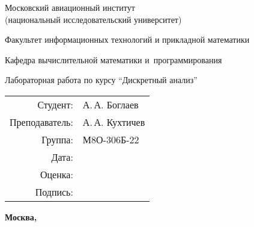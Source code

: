 \begin{titlepage}
    \begin{center}
    \bfseries
    
    {\Large Московский авиационный институт\\ (национальный исследовательский университет)
    
    }
    
    \vspace{48pt}
    
    {\large Факультет информационных технологий и прикладной математики
    }
    
    \vspace{36pt}
    
    {\large Кафедра вычислительной математики и~программирования
    
    }
    
    
    \vspace{48pt}
    
    Лабораторная работа  по курсу \enquote{Дискретный анализ}
    
    \end{center}
    
    \vspace{72pt}
    
    \begin{flushright}
    \begin{tabular}{rl}
    Студент: & А.\,А. Боглаев \\
    Преподаватель: & А.\,А. Кухтичев \\
    Группа: & М8О-306Б-22 \\
    Дата: & \\
    Оценка: & \\
    Подпись: & \\
    \end{tabular}
    \end{flushright}
    
    \vfill
    
    \begin{center}
    \bfseries
    Москва, \the\year
    \end{center}
    \end{titlepage}
    
    \pagebreak